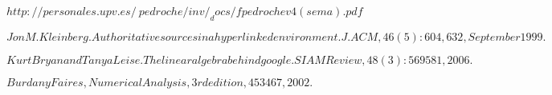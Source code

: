 \begin{thebibliography}{9}

  $http://personales.upv.es/~pedroche/inv/_docs/fpedrochev4(sema).pdf$

$Jon M. Kleinberg. Authoritative sources in a hyperlinked environment. J. ACM,
46(5):604,632, September 1999.$

$Kurt Bryan and Tanya Leise. The linear algebra behind google. SIAM Review, 48(3):569
581, 2006.$

$Burdan y Faires, Numerical Analysis, 3rd edition, 453
467, 2002.$


\end{thebibliography}